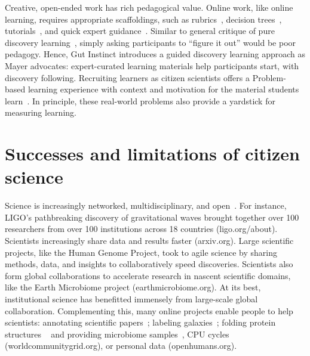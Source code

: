 Creative, open-ended work has rich pedagogical value. Online work, like online learning, requires appropriate scaffoldings, such as rubrics~\cite{Boud1995, Kulkarni2013peer}, decision trees~\cite{Lee2016,Yu2006}, tutorials~\cite{Andersen2012}, and quick expert guidance~\cite{dow2012shepherding}. Similar to general critique of pure discovery learning~\cite{Mayer2004}, simply asking participants to “figure it out” would be poor pedagogy. Hence, Gut Instinct introduces a guided discovery learning approach as Mayer advocates: expert-curated learning materials help participants start, with discovery following. Recruiting learners as citizen scientists offers a Problem-based learning experience with context and motivation for the material students learn~\cite{Savery1995}. In principle, these real-world problems also provide a yardstick for measuring learning. 


\section{Successes and limitations of citizen science}
Science is increasingly networked, multidisciplinary, and
open~\cite{Pandey2017}. For instance, LIGO’s pathbreaking discovery of
gravitational waves brought together over 100 researchers
from over 100 institutions across 18 countries (ligo.org/about). 
Scientists increasingly share data and results faster (arxiv.org). 
Large scientific projects, like the Human Genome Project, 
took to agile science by sharing methods, data, and insights to 
collaboratively speed discoveries. Scientists also form global 
collaborations to accelerate research in nascent scientific domains, 
like the Earth Microbiome project (earthmicrobiome.org).
At its best, institutional science has benefitted immensely
from large-scale global collaboration. Complementing this,
many online projects enable people to help scientists: annotating scientific papers~\cite{Good2013}; labeling galaxies~\cite{JordanRaddick2013}; folding protein structures ~\cite{Cooper2010} and providing microbiome samples~\cite{McDonald2018}, CPU cycles (worldcommunitygrid.org), or personal data (openhumans.org). 

